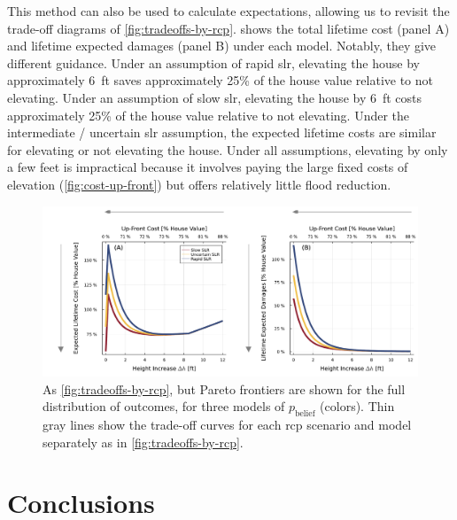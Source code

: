 \documentclass[11pt]{article}
\begin{document}
This method can also be used to calculate expectations, allowing us to revisit the trade-off diagrams of \cref{fig:tradeoffs-by-rcp}.
 shows the total lifetime cost (panel A) and lifetime expected damages (panel B) under each model.
Notably, they give different guidance.
Under an assumption of rapid \gls{slr}, elevating the house by approximately \SI{6}{ft} saves approximately 25\% of the house value relative to not elevating.
Under an assumption of slow \gls{slr}, elevating the house by \SI{6}{ft} costs approximately 25\% of the house value relative to not elevating.
Under the intermediate / uncertain \gls{slr} assumption, the expected lifetime costs are similar for elevating or not elevating the house.
Under all assumptions, elevating by only a few feet is impractical because it involves paying the large fixed costs of elevation (\cref{fig:cost-up-front}) but offers relatively little flood reduction.

\begin{figure}
    \centering
    \includegraphics[width=\textwidth]{tradeoffs-by-prior}
    \caption{
        As \cref{fig:tradeoffs-by-rcp}, but Pareto frontiers are shown for the full distribution of outcomes, for three models of $p_\text{belief}$ (colors).
        Thin gray lines show the trade-off curves for each \gls{rcp} scenario and model separately as in \cref{fig:tradeoffs-by-rcp}.
    }\label{fig:tradeoffs-by-prior}
\end{figure}

\section{Conclusions}\label{sec:conclusions}
\end{document}
